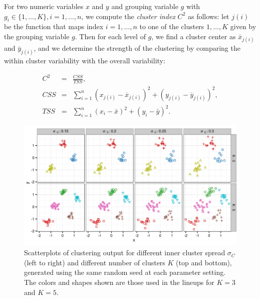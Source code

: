 \documentclass[11pt]{isuthesis}\usepackage[]{graphicx}\usepackage[]{color}
\newenvironment{knitrout}{}{} %
\begin{document}
For two numeric variables $x$ and $y$ and grouping variable $g$ with $g_i \in \{1, ..., K\}, i = 1, ..., n$, we compute the  {\it cluster index} $C^2$ as follows: let $j(i)$ be the function that maps index $i = 1, ..., n$ to one of the clusters $1, ..., K$ given by the grouping variable $g$. Then for each  level of $g$, we find  a cluster center as $\bar{x}_{j(i)}$ and  $\bar{y}_{j(i)}$, and we determine the strength of the clustering by comparing the within cluster variability with the overall variability: 

\begin{eqnarray}\label{eq:clusterMeasure}
C^2 &=& \frac{CSS}{TSS},\\
\nonumber CSS &=& \sum_{i=1}^n \left(x_{j(i)} - \overline{x}_{j(i)}\right)^2 + \left(y_{j(i)} - \overline{y}_{j(i)} \right)^2, \\
\nonumber TSS &=& \sum_{i=1}^n \left(x_i - \bar{x}\right)^2 + \left(y_i - \bar{y}\right)^2.
\end{eqnarray}

\begin{figure}[ht]
\begin{knitrout}
\color{fgcolor}

{\centering \includegraphics[width=\linewidth]{Figure/FeatureHierarchy/fig-cluster-1} 

}



\end{knitrout}
\caption[Parameters affecting $M_C$]{\label{fig:clusters} Scatterplots of clustering output for different inner cluster spread $\sigma_C$  (left to right) and different number of clusters $K$ (top and bottom), generated using the same random seed at each parameter setting. The colors and shapes shown are those used in the lineups for $K=3$ and $K=5$.}
\end{figure}
\end{document}
